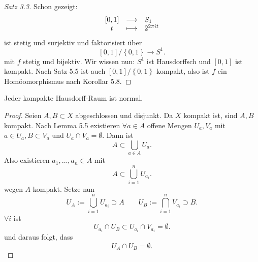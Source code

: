 \begin{proof}[Satz 3.3]
    Schon gezeigt:
        \begin{equation*}
        \begin{array}{c c l} 
            [0,1] & \longrightarrow & S_1 \\
        t & \longmapsto &  2^{2\pi it}
        \end{array}
    \end{equation*}
    ist stetig und surjektiv und faktorisiert über
    \[
        [0,1] /\left \{0,1\right\}  \to  S^1
    .\] 
    mit $f$ stetig und bijektiv. Wir wissen nun:  $S^1$ ist Hausdorffsch und  $[0,1]$ ist kompakt. Nach Satz 5.5 ist auch  $[0,1] /\left \{0,1\right\} $ kompakt, also ist $f$ ein Homöomorphismus nach Korollar 5.8.
\end{proof}


\begin{theorem}
    Jeder kompakte Hausdorff-Raum ist normal.
\end{theorem}
\begin{proof}
    Seien $A,B\subset X$ abgeschlossen und disjunkt. Da $X$ kompakt ist, sind  $A,B$ kompakt. Nach Lemma 5.5 existieren  $\forall a\in A$ offene Mengen $U_a, V_a$ mit $a\in U_a, B\subset V_a$ und $U_a \cap V_a = \emptyset$. Dann ist
    \[
    A \subset \bigcup_{a\in A} U_a
    .\] 
    Also existieren $a_1,\ldots,a_n\in A$ mit
    \[
    A\subset \bigcup_{i=1}^n U_{a_i}
    .\] 
    wegen $A$ kompakt. Setze nun
    \[
    U_A := \bigcup_{i=1}^n U_{a_i}\supset A \qquad U_B := \bigcap_{i=1}^n V_{a_i}\supset B
    .\] 
$\forall i$ ist 
\[
    U_{a_i} \cap U_B \subset U_{a_i} \cap V_{a_i} = \emptyset
.\] 
und daraus folgt, dass
\[
U_A \cap U_B = \emptyset
.\] 
\end{proof}

